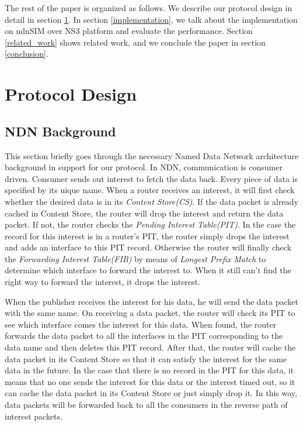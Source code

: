 \documentclass[conference]{IEEEtran}
\begin{document}
The rest of the paper is organized as follows.
We describe our protocol design in detail in section \ref{design}.
In section \ref{implementation},
we talk about the implementation on ndnSIM over NS3 platform and evaluate the performance.
Section \ref{related_work} shows related work,
and we conclude the paper in section \ref{conclusion}.

\section{Protocol Design}
\label{design}

\subsection{NDN Background}
This section briefly goes through the necessary Named Data Network architecture background in support for our protocol.
In NDN, communication is consumer driven.
Consumer sends out interest to fetch the data back.
Every piece of data is specified by its uique name. When a router receives an interest,
it will first check whether the desired data is in its \emph{Content Store(CS)}.
If the data packet is already cached in Content Store,
the router will drop the interest and return the data packet.
If not, the router checks the \emph{Pending Interest Table(PIT)}.
In the case the record for this interest is in a router's PIT,
the router simply drops the interest and adds an interface to this PIT record.
Otherwise the router will finally check the \emph{Forwarding Interest Table(FIB)}
by means of \emph{Longest Prefix Match} to determine which interface to forward the interest to.
When it still can't find the right way to forward the interest, it drops the interest.

When the publisher receives the interest for his data,
he will send the data packet with the same name. On receiving a data packet,
the router will check its PIT to see which interface comes the interest for this data.
When found, the router forwards the data packet to all the interfaces in the PIT
corresponding to the data name and then deletes this PIT record.
After that, the router will cache the data packet in its Content Store
so that it can satisfy the interest for the same data in the future.
In the case that there is no record in the PIT for this data,
it means that no one sends the interest for this data or the interest timed out,
so it can cache the data packet in its Content Store or just simply drop it.
In this way, data packets will be forwarded back to all the consumers in the reverse path of interest packets.
\end{document}
